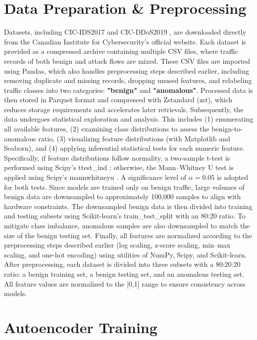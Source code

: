 \section{Data Preparation \& Preprocessing}

Datasets, including CIC-IDS2017 \citep{cicids2017} and CIC-DDoS2019 \citep{cicddos2019}, are downloaded directly from the Canadian Institute for Cybersecurity's official website. Each dataset is provided as a compressed archive containing multiple CSV files, where traffic records of both benign and attack flows are mixed. These CSV files are imported using Pandas, which also handles preprocessing steps described earlier, including removing duplicate and missing records, dropping unused features, and relabeling traffic classes into two categories: \textbf{"benign"} and \textbf{"anomalous"}. Processed data is then stored in Parquet format and compressed with Zstandard (zst), which reduces storage requirements and accelerates later retrievals. Subsequently, the data undergoes statistical exploration and analysis. This includes (1) enumerating all available features, (2) examining class distributions to assess the benign-to-anomalous ratio, (3) visualizing feature distributions (with Matplotlib and Seaborn), and (4) applying inferential statistical tests for each numeric feature. Specifically, if feature distributions follow normality, a two-sample t-test is performed using Scipy’s ttest\_ind \citep{scipytt}; otherwise, the Mann–Whitney U test is applied using Scipy’s mannwhitneyu \citep{scipymt}. A significance level of $\alpha = 0.05$ is adopted for both tests. Since models are trained only on benign traffic, large volumes of benign data are downsampled to approximately 100,000 samples to align with hardware constraints. The downsampled benign data is then divided into training and testing subsets using Scikit-learn's train\_test\_split \citep{sklearntts} with an 80:20 ratio. To mitigate class imbalance, anomalous samples are also downsampled to match the size of the benign testing set. Finally, all features are normalized according to the preprocessing steps described earlier (log scaling, z-score scaling, min–max scaling, and one-hot encoding) using utilities of NumPy, Scipy, and Scikit-learn. After preprocessing, each dataset is divided into three subsets with a 80:20:20 ratio: a benign training set, a benign testing set, and an anomalous testing set. All feature values are normalized to the [0,1] range to ensure consistency across models.

\section{Autoencoder Training}

